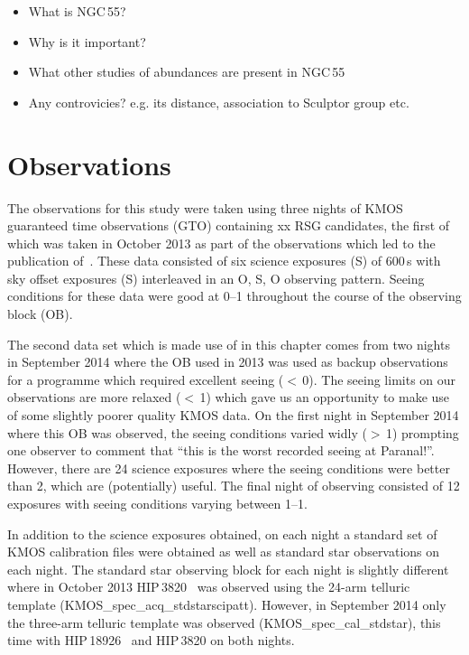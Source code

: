 \begin{itemize}
    \item What is NGC\,55?
    \item Why is it important?
    \item What other studies of abundances are present in NGC\,55
    \item Any controvicies? e.g. its distance, association to Sculptor group etc.
\end{itemize}


\section{Observations} %
\label{sec:observations}

The observations for this study were taken using three nights of KMOS guaranteed time observations (GTO) containing xx RSG candidates, the first of which was taken in October 2013 as part of the observations which led to the publication of~\cite{2015ApJ...805..182G}.
These data consisted of six science exposures (S) of 600\,s with sky offset exposures (S) interleaved in an O, S, O observing pattern.
Seeing conditions for these data were good at 0--1 throughout the course of the observing block (OB).

The second data set which is made use of in this chapter comes from two nights in September 2014 where the OB used in 2013 was used as backup observations for a programme which required excellent seeing ($<$\,0).
The seeing limits on our observations are more relaxed ($<$\,1) which gave us an opportunity to make use of some slightly poorer quality KMOS data.
On the first night in September 2014 where this OB was observed, the seeing conditions varied widly ($>$\,1) prompting one observer to comment that ``this is the worst recorded seeing at Paranal!''.
However, there are 24 science exposures where the seeing conditions were better than 2, which are (potentially) useful.
The final night of observing consisted of 12 exposures with seeing conditions varying between 1--1.

In addition to the science exposures obtained, on each night a standard set of KMOS calibration files were obtained as well as standard star observations on each night.
The standard star observing block for each night is slightly different where in October 2013 HIP\,3820~\citep[B8\,V;]{1978mcts.book.....H} was observed using the 24-arm telluric template (KMOS\_spec\_acq\_stdstarscipatt).
However, in September 2014 only the three-arm telluric template was observed (KMOS\_spec\_cal\_stdstar), this time with HIP\,18926~\citep[B3\,V;]{1988mcts.book.....H} and HIP\,3820 on both nights.

